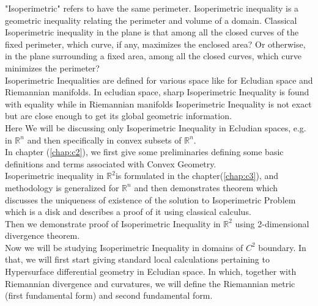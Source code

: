 \documentclass[oneside]{book}
\begin{document}
	"Isoperimetric" refers to have the same perimeter. Isoperimetric inequality is a geometric inequality relating the perimeter and volume of a domain. Classical Isoperimetric inequality in the plane is that among all the closed curves of the fixed perimeter, which curve, if any, maximizes the enclosed area? Or otherwise, in the plane surrounding a fixed area, among all the closed curves, which curve minimizes the perimeter?
	\\
	
	Isoperimetric Inequalities are defined for various space like for Ecludian space and Riemannian manifolds. In ecludian space, sharp Isoperimetric Inequality is found with equality while in Riemannian manifolds Isoperimetric Inequality is not exact but are close enough to get its global geometric information.
	\\
	Here We will be discussing only  Isoperimetric Inequality in Ecludian spaces, e.g. in  $\mathbb{R}^{n}$ and then specifically in convex subsets of $\mathbb{R}^{n}$.
	\\
	
	In chapter (\ref{chap:c2}), we first give some preliminaries defining some basic definitions and terms associated with Convex Geometry.
	\\
	
	Isoperimetric inequality in $\mathbb{R}^2 $is formulated in the chapter(\ref{chap:c3}), and methodology is generalized for $\mathbb{R}^n$ and then demonstrates theorem which discusses the uniqueness of existence of the solution to Isoperimetric Problem which is a disk and describes a proof of it using classical calculus.\\
	Then we demonstrate proof of Isoperimetric Inequality in $\mathbb{R}^2$  using 2-dimensional divergence theorem. \\
	Now we will be studying Isoperimetric Inequality in domains of $C^{2}$ boundary. In that, we will first start giving standard local calculations pertaining to Hypersurface differential geometry in Ecludian space. 
	In which, together with Riemannian divergence and curvatures, we will define the Riemannian metric (first fundamental form) and second fundamental form. 
	\\
	
\end{document}
